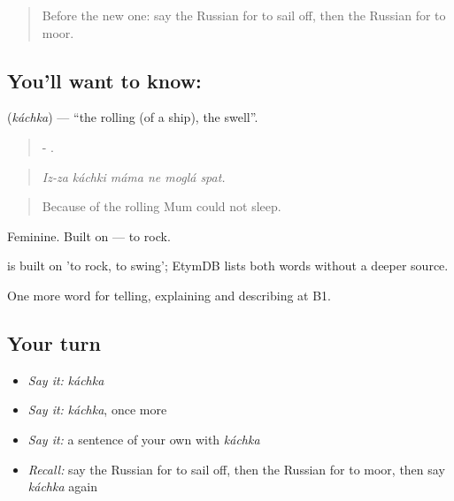 \label{lesson:RU-C425-kachka}



\begin{quote}
Before the new one: say the Russian for to sail off, then the Russian for to moor.
\end{quote}

\subsection*{You'll want to know: }
\textbf{} (\emph{káchka}) — \textquotedblleft{}the rolling (of a ship), the swell\textquotedblright{}.

\begin{quote}
-     .
\end{quote}

\begin{quote}
\emph{Iz-za káchki máma ne moglá spat.}
\end{quote}

\begin{quote}
Because of the rolling Mum could not sleep.
\end{quote}

Feminine. Built on \emph{} — to rock.

\begin{cousinweb}
\emph{} is built on \emph{} 'to rock, to swing'; EtymDB lists both words without a deeper source.
\end{cousinweb}

\begin{grammarlens}[title={What you've built}]
One more word for telling, explaining and describing at B1.
\end{grammarlens}

\subsection*{Your turn}
\begin{itemize}
\raggedright
  \item \emph{Say it:} \emph{káchka}
  \item \emph{Say it:} \emph{káchka}, once more
  \item \emph{Say it:} a sentence of your own with \emph{káchka}
  \item \emph{Recall:} say the Russian for to sail off, then the Russian for to moor, then say \emph{káchka} again
\end{itemize}

